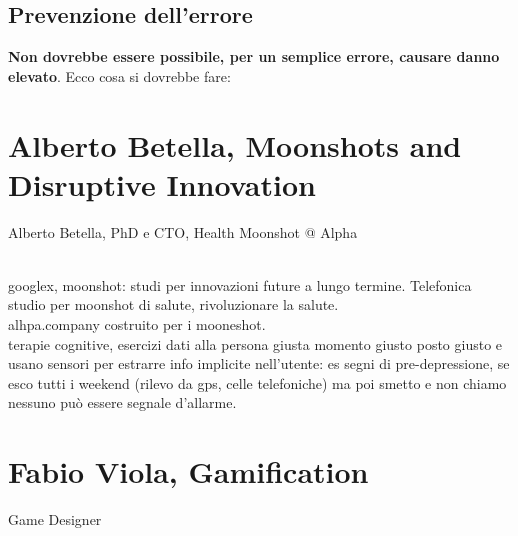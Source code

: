 \documentclass[10pt]{article}
\begin{document}
\subsection{Prevenzione dell'errore}
\textbf{Non dovrebbe essere possibile, per un semplice errore, causare danno elevato}. Ecco cosa si dovrebbe fare:
\begin{list}{}{}
\end{list}
\pagebreak
\section{Alberto Betella, Moonshots and Disruptive Innovation}
\begin{scriptsize}
Alberto Betella, PhD e CTO, Health Moonshot @ Alpha\\\\
\end{scriptsize}
googlex, moonshot: studi per innovazioni future a lungo termine. Telefonica studio per moonshot di salute, rivoluzionare la salute.\\
alhpa.company costruito per i mooneshot.\\
terapie cognitive, esercizi dati alla persona giusta momento giusto posto giusto e usano sensori per estrarre info implicite nell'utente: es segni di pre-depressione, se esco tutti i weekend (rilevo da gps, celle telefoniche) ma poi smetto e non chiamo nessuno può essere segnale d'allarme.
\section{Fabio Viola, Gamification}
Game Designer
\end{document}
